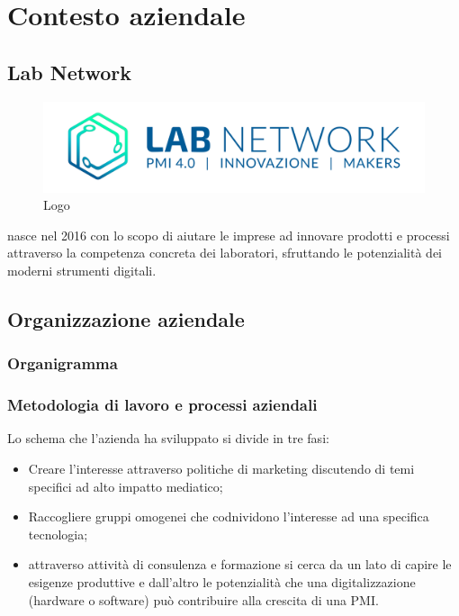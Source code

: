 
\chapter{Contesto aziendale}
\label{cap:introduzione}

\section{Lab Network}

\begin{figure}[H]
	\begin{center}
	\includegraphics[scale=0.4]{immagini/LOGO_LABNETWORK.png}
	\caption{Logo \lab{}}
	\end{center}
\end{figure}

\lab{} nasce nel 2016 con lo scopo di aiutare le imprese ad innovare prodotti e processi attraverso la competenza concreta dei laboratori, sfruttando le potenzialità dei moderni strumenti digitali.

\section{Organizzazione aziendale}
\subsection{Organigramma}
\subsection{Metodologia di lavoro e processi aziendali}
Lo schema che l'azienda ha sviluppato si divide in tre fasi:
\begin{itemize}
\item Creare l’interesse attraverso politiche di marketing discutendo di temi specifici ad alto impatto mediatico;
\item Raccogliere gruppi omogenei che codnividono l'interesse ad una specifica tecnologia;
\item attraverso attività di consulenza e formazione si cerca da un lato di capire le esigenze produttive e dall’altro le potenzialità che una digitalizzazione (hardware o software) può contribuire alla crescita di una PMI.
\end{itemize}


